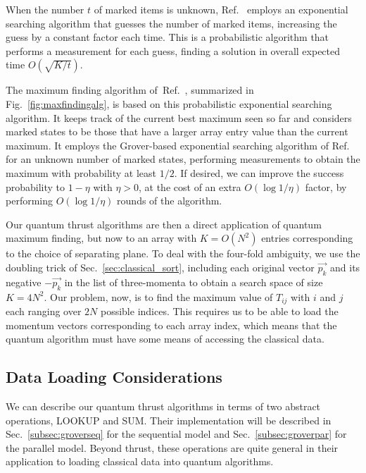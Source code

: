 \documentclass[aps,prd,twocolumn,superscriptaddress,preprintnumbers,nofootinbib,longbibliography,floatfix]{revtex4-1}
\DeclareRobustCommand{\Sec}[1]{Sec.~\ref{#1}}
\DeclareRobustCommand{\Fig}[1]{Fig.~\ref{#1}}
\DeclareRobustCommand{\Ref}[1]{Ref.~\cite{#1}}
\begin{document}
When the number $t$ of marked items is unknown, \Ref{Boyer:1996zf} employs an exponential searching algorithm that guesses the number of marked items, increasing the guess by a constant factor each time.
%
This is a probabilistic algorithm that performs a measurement for each guess, finding a solution in overall expected time $O(\sqrt{K/t})$.


The maximum finding algorithm of~\Ref{Durr:1996nx}, summarized in \Fig{fig:maxfindingalg}, is based on this probabilistic exponential searching algorithm.
%
It keeps track of the current best maximum seen so far and considers marked states to be those that have a larger array entry value than the current maximum.
%
It employs the Grover-based exponential searching algorithm of \Ref{Boyer:1996zf} for an unknown number of marked states, performing measurements to obtain the maximum with probability at least $1/2$.
%
If desired, we can improve the success probability to $1-\eta$ with $\eta>0$, at the cost of an extra $O(\log 1/\eta)$ factor, by performing $O(\log 1/\eta)$ rounds of the algorithm.
%



Our quantum thrust algorithms are then a direct application of quantum maximum finding, but now to an array with $K=O(N^2)$ entries corresponding to the choice of separating plane.
%
To deal with the four-fold ambiguity, we use the doubling trick of \Sec{sec:classical_sort}, including each original vector $\vec{p_k}$ and its negative $-\vec{p_k}$ in the list of three-momenta to obtain a search space of size $K=4N^2$.
%
Our problem, now, is to find the maximum value of $T_{ij}$ with $i$ and $j$ each ranging over $2N$ possible indices.
%
This requires us to be able to load the momentum vectors corresponding to each array index, which means that the quantum algorithm must have some means of accessing the classical data.


\subsection{Data Loading Considerations}

We can describe our quantum thrust algorithms in terms of two abstract operations, LOOKUP and SUM.
%
Their implementation will be described in \Sec{subsec:groverseq} for the sequential model and \Sec{subsec:groverpar} for the parallel model.
%
Beyond thrust, these operations are quite general in their application to loading classical data into quantum algorithms.
\end{document}
